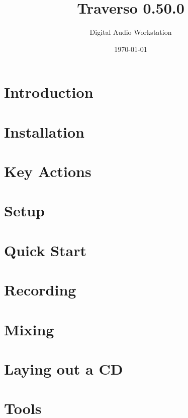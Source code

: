 \documentclass[a4paper,
               12pt,
               pdftex,
               twoside,
               smallheadings,
               headinclude,
               headsepline,
               DIV16,
               BCOR10mm
               ]{scrreprt}
\newcommand{\clearemptydoublepage}{\newpage\thispagestyle{empty}\cleardoublepage}
\begin{document}
\title{Traverso 0.50.0}
\author{Digital Audio Workstation}
\date{\today}

\begin{titlepage}
  
\end{titlepage}
  \clearemptydoublepage
  
  \clearemptydoublepage

\setcounter{page}{1}


\tableofcontents


\chapter{Introduction\label{sect_introduction}}

\chapter{Installation\label{sect_installation}}

\chapter{Key Actions\label{sect_keyactions}}

\chapter{Setup\label{sect_setup}}

\chapter{Quick Start\label{sect_quickstart}}

\chapter{Recording\label{sect_recording}}

\chapter{Mixing\label{sect_mixing}}

\chapter{Laying out a CD\label{sect_cdburning}}

\chapter{Tools\label{sect_tools}}

\end{document}
